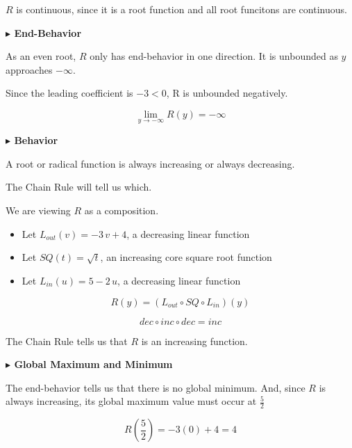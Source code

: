 \documentclass{ximera}
\begin{document}
\begin{example}
$R$ is continuous, since it is a root function and all root funcitons are continuous. 






\textbf{\textcolor{blue!55!black}{$\blacktriangleright$ End-Behavior}} 


As an even root, $R$ only has end-behavior in one direction. It is unbounded as $y$ approaches $-\infty$. 

Since the leading coefficient is $-3 < 0$, R is unbounded negatively. 


\[
\lim\limits_{y \to -\infty} R(y) = -\infty
\]












\textbf{\textcolor{blue!55!black}{$\blacktriangleright$ Behavior}} 


A root or radical function is always increasing or always decreasing. 

The Chain Rule will tell us which.


We are viewing $R$ as a composition.


\begin{itemize}
\item Let $L_{out}(v) = -3 \, v + 4$, a decreasing linear function
\item Let $SQ(t) = \sqrt{t}$, an increasing core square root function
\item Let $L_{in}(u) = 5 - 2 \, u$, a decreasing linear function
\end{itemize}

\[  R(y) = (L_{out} \circ SQ \circ L_{in})(y)  \]

\[ dec \circ inc \circ dec = inc \]

The Chain Rule tells us that $R$ is an increasing function.



\textbf{\textcolor{blue!55!black}{$\blacktriangleright$ Global Maximum and Minimum}} 



The end-behavior tells us that there is no global minimum. And, since $R$ is always increasing, its global maximum value must occur at $\frac{5}{2}$


\[
R\left( \frac{5}{2}\right) = -3 (0) + 4 = 4
\]










\end{example}
\end{document}
